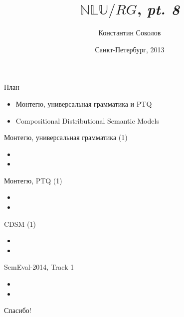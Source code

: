 \documentclass{beamer}
\begin{document}
\title{\huge{$\mathbb{NLU}/RG$, \textit{pt. 8}}}
\author{Константин Соколов}
\date{Санкт-Петербург, 2013} 
\begin{frame}
    \thispagestyle{empty}
    \titlepage
\end{frame}

\begin{frame}{План}
    \setcounter{framenumber}{1}
    \begin{itemize}
        \item Монтегю, универсальная грамматика и PTQ
        \item Compositional Distributional Semantic Models
    \end{itemize}
\end{frame}

\begin{frame}{Монтегю, универсальная грамматика (1)}
\begin{itemize}
  \item 
  \item 
\end{itemize}
\end{frame}

\begin{frame}{Монтегю, PTQ (1)}
\begin{itemize}
  \item 
  \item 
\end{itemize}
\end{frame}

\begin{frame}{CDSM (1)}
\begin{itemize}
  \item 
  \item 
\end{itemize}
\end{frame}

\begin{frame}{SemEval-2014, Track 1}
\begin{itemize}
  \item 
  \item 
\end{itemize}
\end{frame}

\begin{frame}{}
    \thispagestyle{empty}
    \begin{center}
        {\large Спасибо!}
    \end{center}
\end{frame}


\end{document}
